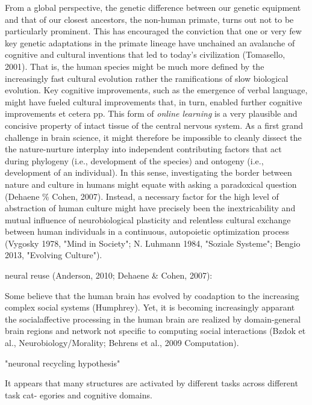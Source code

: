 \documentclass[authoryear,review,3p]{elsarticle}
\begin{document}
From a global perspective,
the genetic difference between our genetic equipment and that
of our closest ancestors, the non-human primate, turns out not to be 
particularly prominent.
This has encouraged the conviction that one or very few key genetic
adaptations in the primate lineage have unchained an avalanche
of cognitive and cultural inventions that led to today's civilization
(Tomasello, 2001).
That is, the human species might be much more defined by the
increasingly fast cultural evolution rather the ramifications
of slow biological evolution.
Key cognitive improvements, such as the emergence of verbal language,
might have fueled cultural improvements that, in turn, enabled
further cognitive improvements et cetera pp.
This form of \textit{online learning} is a very plausible and concisive
property of intact tissue of the central nervous system.
%
As a first grand challenge in brain science,
it might therefore be impossible to cleanly dissect the
the nature-nurture interplay into independent contributing factors that act
during
phylogeny (i.e., development of the species)
and
ontogeny (i.e., development of an individual).
%
In this sense,
investigating the border between nature and culture in humans
might equate with asking a paradoxical question
(Dehaene \% Cohen, 2007).
%
Instead,
a necessary factor for the high level of abstraction of human culture
might have precisely been the inextricability and mutual influence of
neurobiological plasticity and relentless cultural exchange
between human individuals
in a continuous, autopoietic optimization process
(Vygosky 1978, "Mind in Society"; N. Luhmann 1984, "Soziale Systeme";
Bengio 2013, "Evolving Culture").









neural reuse (Anderson, 2010; Dehaene & Cohen, 2007):

Some believe that the human brain has evolved by coadaption to
the increasing complex social systems (Humphrey).
Yet, it is becoming increasingly apparant the socialaffective processing
in the human brain are realized by domain-general
brain regions and network not specific to computing social interactions
(Bzdok et al., Neurobiology/Morality; Behrens et al., 2009 Computation).

"neuronal recycling hypothesis"

It appears that many structures are activated by different tasks across different task cat- egories and cognitive domains. 
\end{document}
